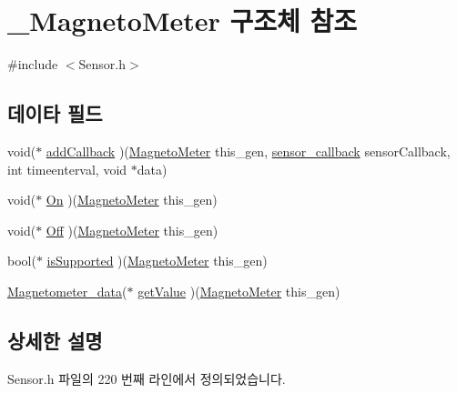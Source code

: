 \hypertarget{struct___magneto_meter}{\section{\-\_\-\-Magneto\-Meter 구조체 참조}
\label{struct___magneto_meter}
}


{\ttfamily \#include $<$Sensor.\-h$>$}

\subsection*{데이타 필드}
\begin{DoxyCompactItemize}
\item 
void($\ast$ \hyperlink{struct___magneto_meter_a9181e28db7a7c1bc776db231010abe84}{add\-Callback} )(\hyperlink{_sensor_8h_ad8c508f6ecfa0fb3f0cc332431821142}{Magneto\-Meter} this\-\_\-gen, \hyperlink{_sensor_8h_ad8114207845fc5e0aa30832f0c718cd6}{sensor\-\_\-callback} sensor\-Callback, int timeenterval, void $\ast$data)
\item 
void($\ast$ \hyperlink{struct___magneto_meter_adaae4fb51ff33457e414eb8924c85075}{On} )(\hyperlink{_sensor_8h_ad8c508f6ecfa0fb3f0cc332431821142}{Magneto\-Meter} this\-\_\-gen)
\item 
void($\ast$ \hyperlink{struct___magneto_meter_ae74e6adbf008d638c954bf852fef4657}{Off} )(\hyperlink{_sensor_8h_ad8c508f6ecfa0fb3f0cc332431821142}{Magneto\-Meter} this\-\_\-gen)
\item 
bool($\ast$ \hyperlink{struct___magneto_meter_aac07cae3561bfd9df065be55fb79f145}{is\-Supported} )(\hyperlink{_sensor_8h_ad8c508f6ecfa0fb3f0cc332431821142}{Magneto\-Meter} this\-\_\-gen)
\item 
\hyperlink{_sensor_8h_afbe589975942218ce5662af2ba07d106}{Magnetometer\-\_\-data}($\ast$ \hyperlink{struct___magneto_meter_a481059371d9d2a273df0fabe18e388a0}{get\-Value} )(\hyperlink{_sensor_8h_ad8c508f6ecfa0fb3f0cc332431821142}{Magneto\-Meter} this\-\_\-gen)
\end{DoxyCompactItemize}


\subsection{상세한 설명}


Sensor.\-h 파일의 220 번째 라인에서 정의되었습니다.



